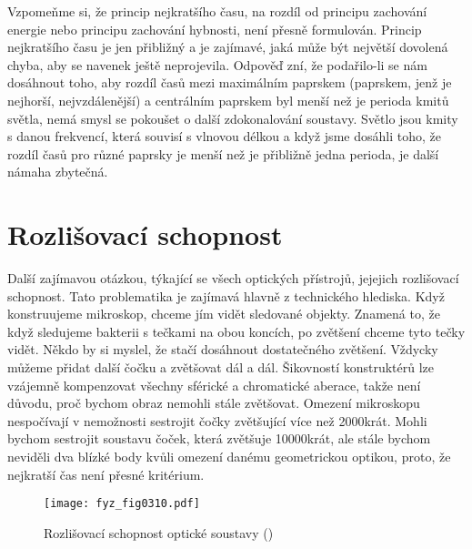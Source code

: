     Vzpomeňme si, že princip nejkratšího času, na rozdíl od principu zachování energie nebo 
    principu zachování hybnosti, není přesně formulován. Princip nejkratšího času je jen přibližný 
    a je zajímavé, jaká může být největší dovolená chyba, aby se navenek ještě neprojevila. Odpověď 
    zní, že podařilo-li se nám dosáhnout toho, aby rozdíl časů mezi maximálním paprskem (paprskem, 
    jenž je nejhorší, nejvzdálenější) a centrálním paprskem byl menší než je perioda kmitů světla, 
    nemá smysl se pokoušet o další zdokonalování soustavy. Světlo jsou kmity s danou frekvencí, 
    která souvisí s vlnovou délkou a když jsme dosáhli toho, že rozdíl časů pro různé paprsky je 
    menší než je přibližně jedna perioda, je další námaha zbytečná.
  
  \section{Rozlišovací schopnost}\label{fyz:IchapXXVIIsecVII}
    Další zajímavou otázkou, týkající se všech optických přístrojů, jejejich rozlišovací schopnost. 
    Tato problematika je zajímavá hlavně z technického hlediska. Když konstruujeme mikroskop, 
    chceme jím vidět sledované objekty. Znamená to, že když sledujeme bakterii s tečkami na obou 
    koncích, po zvětšení chceme tyto tečky vidět. Někdo by si myslel, že stačí dosáhnout 
    dostatečného zvětšení. Vždycky můžeme přidat další čočku a zvětšovat dál a dál. Šikovností 
    konstruktérů lze vzájemně kompenzovat všechny sférické a chromatické aberace, takže není 
    důvodu, proč bychom obraz nemohli stále zvětšovat. Omezení mikroskopu nespočívají v nemožnosti 
    sestrojit čočky zvětšující více než \num{2000}krát. Mohli bychom sestrojit soustavu čoček, 
    která zvětšuje \num{10 000}krát, ale stále bychom neviděli dva blízké body kvůli omezení danému 
    geometrickou optikou, proto, že nejkratší čas není přesné kritérium.
    
    \begin{figure}[ht!] %
      \centering
      \texttt{[image: fyz\_fig0310.pdf]}
      \caption{Rozlišovací schopnost optické soustavy
               (\cite[s.~355]{Feynman01})}
      \label{fyz:fig0310}
    \end{figure}
    
